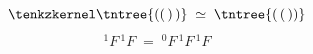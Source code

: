 \[
  \tenkzkernel
  \tntree{(({}\,{})\,{})} \;\simeq\; \tntree{({}\,({}\,{}))}
\]
\[
  {}^{1}F\,{}^{1}F \;=\; {}^{0}F\,{}^{1}F\,{}^{1}F
\]
